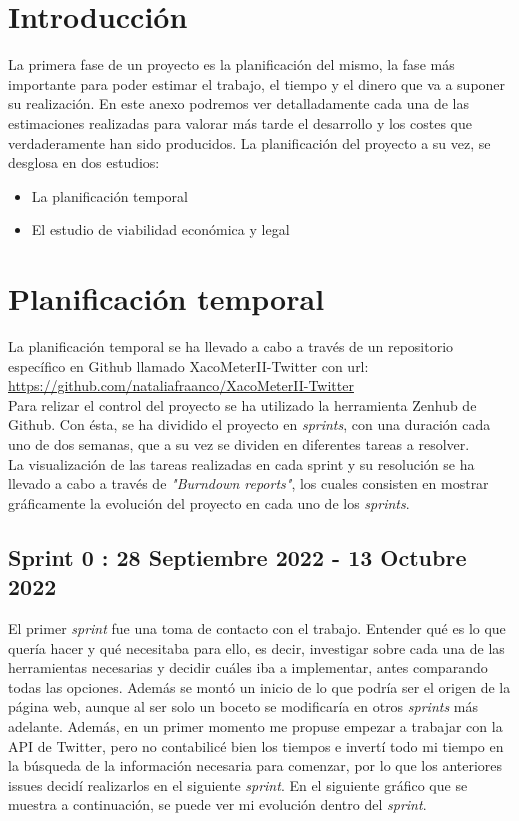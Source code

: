 
\section{Introducción}
La primera fase de un proyecto es la planificación del mismo, la fase más importante para poder estimar el trabajo, el tiempo y el dinero que va a suponer su realización. En este anexo podremos ver detalladamente cada una de las estimaciones realizadas para valorar más tarde el desarrollo y los costes que verdaderamente han sido producidos.
La planificación del proyecto a su vez, se desglosa en dos estudios:
\begin{itemize}
    \item {La planificación temporal}
    \item {El estudio de viabilidad económica y legal}
\end{itemize}



\section{Planificación temporal}
La planificación temporal se ha llevado a cabo a través de un repositorio específico en Github llamado XacoMeterII-Twitter con url: \url{https://github.com/nataliafraanco/XacoMeterII-Twitter}\\
Para relizar el control del proyecto se ha utilizado la herramienta Zenhub de Github. Con ésta, se ha dividido el proyecto en \textit{sprints}, con una duración cada uno de dos semanas, que a su vez se dividen en diferentes tareas a resolver.\\
La visualización de las tareas realizadas en cada sprint y su resolución se ha llevado a cabo a través de \textit{"Burndown reports"}, los cuales consisten en mostrar gráficamente la evolución del proyecto en cada uno de los \textit{sprints}.

\subsection{Sprint 0 : 28 Septiembre 2022 - 13 Octubre 2022}
El primer \textit{sprint} fue una toma de contacto con el trabajo. Entender qué es lo que quería hacer y qué necesitaba para ello, es decir, investigar sobre cada una de las herramientas necesarias y decidir cuáles iba a implementar, antes comparando todas las opciones.
Además se montó un inicio de lo que podría ser el origen de la página web, aunque al ser solo un boceto se modificaría en otros \textit{sprints} más adelante.
Además, en un primer momento me propuse empezar a trabajar con la API de Twitter, pero no contabilicé bien los tiempos e invertí todo mi tiempo en la búsqueda de la información necesaria para comenzar, por lo que los anteriores issues decidí realizarlos en el siguiente \textit{sprint}.
En el siguiente gráfico que se muestra a continuación, se puede ver mi evolución dentro del \textit{sprint}.


